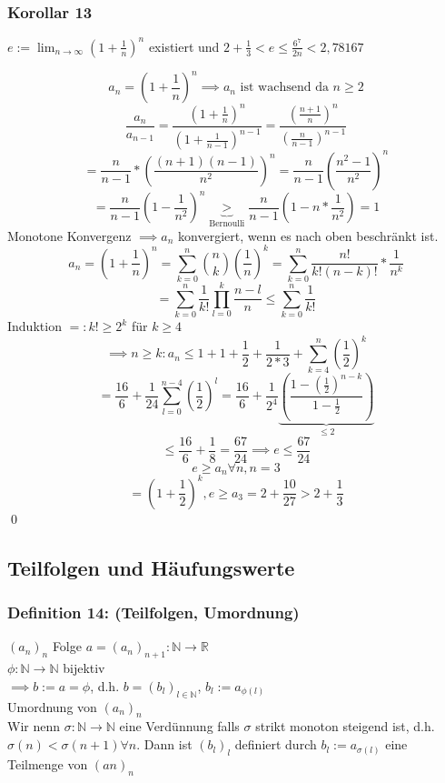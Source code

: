 \documentclass[fleqn]{scrartcl}
\renewenvironment{proof}{{\bfseries Beweis }}{\qed}
\begin{document}
\subsubsection{Korollar 13}
$e := \lim_{n \rightarrow \infty} (1 + \frac{1}{n})^n$ existiert und $2 + \frac{1}{3} < e \leq \frac{6^7}{2n} < 2,78167$

\begin{proof}
$$a_n = (1 + \frac{1}{n})^n \implies a_n\text{ ist wachsend da } n\geq 2$$
$$\frac{a_n}{a_{n-1}} = \frac{(1+\frac{1}{n})^n}{(1+\frac{1}{n-1})^{n-1}} = \frac{(\frac{n+1}{n})^n}{(\frac{n}{n-1})^{n-1}}$$
$$= \frac{n}{n-1} * (\frac{(n+1)(n-1)}{n^2})^n = \frac{n}{n-1} (\frac{n^2 - 1}{n^2})^n$$
$$= \frac{n}{n-1} (1-\frac{1}{n^2})^n \underbrace{>}_{\text{Bernoulli}} \frac{n}{n-1} (1 - n * \frac{1}{n^2}) = 1$$
Monotone Konvergenz $\implies a_n$ konvergiert, wenn es nach oben beschränkt ist.
$$a_n = (1 + \frac{1}{n})^n = \sum_{k = 0}^n \binom{n}{k} (\frac{1}{n})^k = \sum_{k=0}^n \frac{n!}{k!(n-k)!} * \frac{1}{n^k}$$
$$= \sum_{k =0}^n \frac{1}{k!} \prod_{l=0}^k \frac{n-l}{n} \leq \sum_{k=0}^n \frac{1}{k!}$$
Induktion $=: k! \geq 2^k$ für $k\geq 4$\\
$$\implies n \geq k: a_n \leq 1 + 1 + \frac{1}{2} +  \frac{1}{2 * 3} + \sum_{k = 4}^n (\frac{1}{2})^k$$
$$= \frac{16}{6} + \frac{1}{24} \sum_{l = 0}^{n-4} (\frac{1}{2})^l = \frac{16}{6} + \frac{1}{2^4} \underbrace{(\frac{1-(\frac{1}{2})^{n-k}}{1-\frac{1}{2}})}_{\leq 2}$$
$$\leq \frac{16}{6} + \frac{1}{8} = \frac{67}{24} \implies e \leq \frac{67}{24}$$
$$e \geq a_n \forall n, n = 3$$
$$=(1 + \frac{1}{2})^k, e \geq a_3 = 2 + \frac{10}{27} > 2 + \frac{1}{3}$$
\end{proof}
\subsection{Teilfolgen und Häufungswerte}
\subsubsection{Definition 14: (Teilfolgen, Umordnung)} $(a_n)_n$ Folge $a = (a_n)_{n+1}: \mathbb{N} \rightarrow \mathbb{R}$\\
$\phi : \mathbb{N} \rightarrow \mathbb{N}$ bijektiv\\
$\implies b:= a = \phi$, d.h. $b = (b_l)_{l\in\mathbb{N}}$, $b_l := a_{\phi (l)}$\\
Umordnung von $(a_n)_n$\\
Wir nenn $\sigma : \mathbb{N} \rightarrow \mathbb{N}$ eine Verdünnung falls $\sigma$ strikt monoton steigend ist, d.h. $\sigma (n) < \sigma (n+1) \forall n$. Dann ist $(b_l)_l$ definiert durch $b_l := a_{\sigma (l)}$ eine Teilmenge von $(an)_n$
\end{document}
